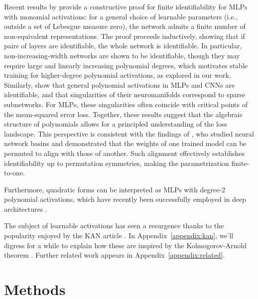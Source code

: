 \documentclass{article} %
\theoremstyle{plain}
\theoremstyle{definition}
\theoremstyle{remark}
\begin{document}
Recent results by \citet{usevich2025identifiability} provide a constructive proof for finite identifiability for MLPs with monomial activations: for a general choice of learnable parameters (i.e., outside a set of Lebesgue measure zero), the network admits a finite number of non-equivalent representations. The proof proceeds inductively, showing that if pairs of layers are identifiable, the whole network is identifiable. In particular, non-increasing-width networks are shown to be identifiable, though they may require large and linearly increasing polynomial degrees, which motivates stable training for higher-degree polynomial activations, as explored in our work. Similarly,  \citet{shahverdi2026learning} show that general polynomial activations in MLPs and CNNs are identifiable, and that singularities of their neuromanifolds correspond to sparse subnetworks. For MLPs, these singularities often coincide with critical points of the mean-squared error loss. Together, these results suggest that the algebraic structure of polynomials allows for a principled understanding of the loss landscape. This perspective is consistent with the findings of \citet{ainsworth2023git}, who studied neural network basins and demonstrated that the weights of one trained model can be permuted to align with those of another. Such alignment effectively establishes identifiability up to permutation symmetries, making the parametrization finite-to-one. %

Furthermore, quadratic forms can be interpreted as MLPs with degree-2 polynomial activations, which have recently been successfully employed in deep architectures \cite{fan2023expressivity, chen2025quadenhancer}. 

The subject of learnable activations has seen a resurgence thanks to the popularity enjoyed by the KAN article \cite{liu2025kan}. In Appendix~\ref{appendix:kan}, we'll digress for a while to explain how these are inspired by the Kolmogorov-Arnold theorem \cite{kolmogorov1957representation}. 
Further related work appears in Appendix~\ref{appendix:related}.

\section{Methods}
\end{document}
